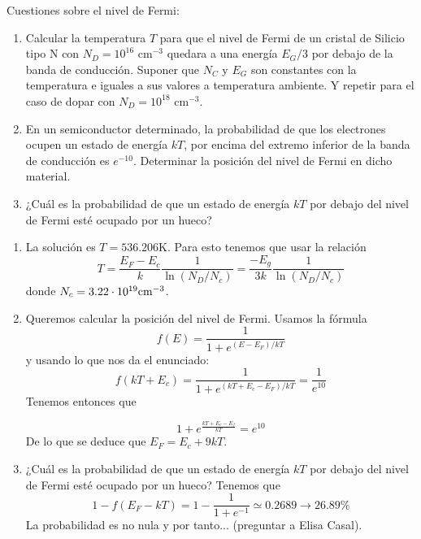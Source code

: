\begin{texercise}
	Cuestiones sobre el nivel de Fermi:

	\begin{enumerate}[label=\alph*)]
		\item Calcular la temperatura \( T \) para que el nivel de Fermi de un cristal de Silicio tipo N con \( N_D = 10^{16} \) cm\(^{-3}\) quedara a una energía \( E_G/3 \) por debajo de la banda de conducción. Suponer que \( N_C \) y \( E_G \) son constantes con la temperatura e iguales a sus valores a temperatura ambiente. Y repetir para el caso de dopar con \( N_D = 10^{18} \) cm\(^{-3}\).

		\item En un semiconductor determinado, la probabilidad de que los electrones ocupen un estado de energía \( kT \), por encima del extremo inferior de la banda de conducción es \( e^{-10} \). Determinar la posición del nivel de Fermi en dicho material.

		\item ¿Cuál es la probabilidad de que un estado de energía \( kT \) por debajo del nivel de Fermi esté ocupado por un hueco?
	\end{enumerate}

	\tcblower

	\begin{enumerate}[label=\alph*)]
		\item La solución es $T=536.206$K. Para esto tenemos que usar la relación
		      \begin{equation}
			      T = \frac{E_F-E_c}{k} \frac{1}{\ln (N_D/N_c)} =  \frac{-E_g}{3k} \frac{1}{\ln (N_D/N_c)}
		      \end{equation}
		      donde $N_c=3.22\cdot 10^{19}\text{cm}^{-3}$.
		\item Queremos calcular la posición del nivel de Fermi. Usamos la fórmula
		      \begin{equation}
			      f(E) = \frac{1}{1+e^{(E-E_F)/kT}}
		      \end{equation}
		      y usando lo que nos da el enunciado:
		      \begin{equation}
			      f(kT+E_c) = \frac{1}{1+e^{(kT+E_c-E_F)/kT}}
			      = \frac{1}{e^{10}}
		      \end{equation}
		      Tenemos entonces que

		      \begin{equation}
			      1+e^{\frac{kT+E_c-E_f}{kT}} = e^{10}
		      \end{equation}
		      De lo que se deduce que $E_F = E_c + 9kT$.
		\item ¿Cuál es la probabilidad de que un estado de energía \( kT \) por debajo del nivel de Fermi esté ocupado por un hueco? Tenemos que
		      \begin{equation}
			      1-f(E_F-kT) = 1 - \frac{1}{1+e^{-1}} \simeq 0.2689 \rightarrow 26.89 \%
		      \end{equation}
		      La probabilidad es no nula y por tanto... (preguntar a Elisa Casal).
	\end{enumerate}
\end{texercise}



